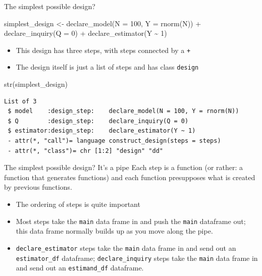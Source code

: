 \documentclass[
  11pt,
  ignorenonframetext,
]{beamer}
\newenvironment{Shaded}{\begin{snugshade}}{\end{snugshade}}
\newcommand{\AttributeTok}[1]{\textcolor[rgb]{0.40,0.45,0.13}{#1}}
\newcommand{\DecValTok}[1]{\textcolor[rgb]{0.68,0.00,0.00}{#1}}
\newcommand{\FunctionTok}[1]{\textcolor[rgb]{0.28,0.35,0.67}{#1}}
\newcommand{\NormalTok}[1]{\textcolor[rgb]{0.00,0.23,0.31}{#1}}
\newcommand{\OtherTok}[1]{\textcolor[rgb]{0.00,0.23,0.31}{#1}}
\newcommand{\SpecialCharTok}[1]{\textcolor[rgb]{0.37,0.37,0.37}{#1}}
\providecommand{\tightlist}{%
  \setlength{\itemsep}{0pt}\setlength{\parskip}{0pt}}\usepackage{longtable,booktabs,array}
\begin{document}
\begin{frame}[fragile]{The simplest possible design?}
\protect\hypertarget{the-simplest-possible-design}{}
\begin{Shaded}
\begin{Highlighting}[]
\NormalTok{simplest\_design }\OtherTok{\textless{}{-}} 
  \FunctionTok{declare\_model}\NormalTok{(}\AttributeTok{N =} \DecValTok{100}\NormalTok{, }\AttributeTok{Y =} \FunctionTok{rnorm}\NormalTok{(N)) }\SpecialCharTok{+}
  \FunctionTok{declare\_inquiry}\NormalTok{(}\AttributeTok{Q =} \DecValTok{0}\NormalTok{) }\SpecialCharTok{+}
  \FunctionTok{declare\_estimator}\NormalTok{(Y }\SpecialCharTok{\textasciitilde{}} \DecValTok{1}\NormalTok{)}
\end{Highlighting}
\end{Shaded}

\begin{itemize}
\tightlist
\item
  This design has three steps, with steps connected by a \texttt{+}
\item
  The design itself is just a list of steps and has class
  \texttt{design}
\end{itemize}

\begin{Shaded}
\begin{Highlighting}[]
\FunctionTok{str}\NormalTok{(simplest\_design)}
\end{Highlighting}
\end{Shaded}

\begin{verbatim}
List of 3
 $ model    :design_step:    declare_model(N = 100, Y = rnorm(N)) 
 $ Q        :design_step:    declare_inquiry(Q = 0) 
 $ estimator:design_step:    declare_estimator(Y ~ 1) 
 - attr(*, "call")= language construct_design(steps = steps)
 - attr(*, "class")= chr [1:2] "design" "dd"
\end{verbatim}
\end{frame}

\begin{frame}[fragile]{The simplest possible design? It's a pipe}
\protect\hypertarget{the-simplest-possible-design-its-a-pipe}{}
Each step is a function (or rather: a function that generates functions)
and each function presupposes what is created by previous functions.

\begin{itemize}
\tightlist
\item
  The ordering of steps is quite important
\item
  Most steps take the \texttt{main} data frame in and push the
  \texttt{main} dataframe out; this data frame normally builds up as you
  move along the pipe.
\item
  \texttt{declare\_estimator} steps take the \texttt{main} data frame in
  and send out an \texttt{estimator\_df} dataframe;
  \texttt{declare\_inquiry} steps take the \texttt{main} data frame in
  and send out an \texttt{estimand\_df} dataframe.
\end{itemize}
\end{frame}
\end{document}
